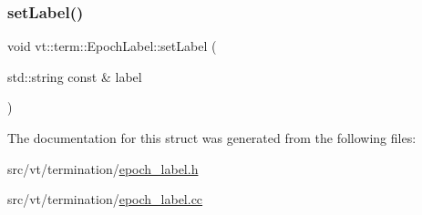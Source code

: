\mbox{\label{structvt_1_1term_1_1_epoch_label_ac140591669a7a6773626612feefe6009}} 
\subsubsection{\texorpdfstring{set\+Label()}{setLabel()}}
{\footnotesize\ttfamily void vt\+::term\+::\+Epoch\+Label\+::set\+Label (\begin{DoxyParamCaption}\item[{std\+::string const \&}]{label }\end{DoxyParamCaption})}



The documentation for this struct was generated from the following files\+:\begin{DoxyCompactItemize}
\item 
src/vt/termination/\hyperlink{epoch__label_8h}{epoch\+\_\+label.\+h}\item 
src/vt/termination/\hyperlink{epoch__label_8cc}{epoch\+\_\+label.\+cc}\end{DoxyCompactItemize}
